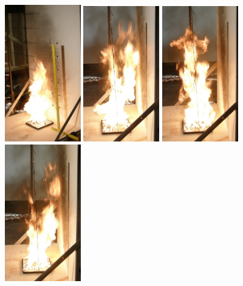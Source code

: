 \documentclass[twoside]{uocthesis}
\begin{document}
\begin{figure}[p]
	\includegraphics[width=1.3in]{../Figures/IWGBGAS6_Seq1}
	\includegraphics[width=1.3in]{../Figures/IWGBGAS6_Seq2}
	\includegraphics[width=1.3in]{../Figures/IWGBGAS6_Seq3}
	\includegraphics[width=1.3in]{../Figures/IWGBGAS6_Seq4} \\


\end{figure}
\end{document}
